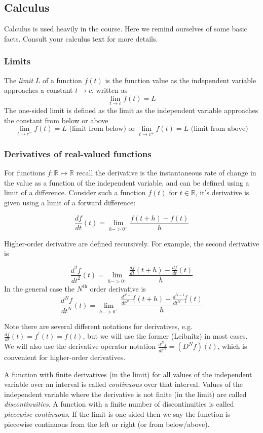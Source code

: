 \subsection{Calculus}

Calculus is used heavily in the course. Here we remind ourselves of some basic facts. Consult your calculus text for more details.

\subsubsection*{Limits}

The \textit{limit} $L$ of a function $f(t)$ is the function value as the independent variable approaches a constant $t\rightarrow c$, written as
\[
\lim_{t\rightarrow c} f(t) = L
\]
The one-sided limit is defined as the limit as the independent variable approaches the constant from below or above
\[
\lim_{t\rightarrow c^-} f(t) = L \mbox{ (limit from below) or } \lim_{t\rightarrow c^+} f(t) = L \mbox{ (limit from above)}
\]

\subsubsection*{Derivatives of real-valued functions}

For functions $f:\mathbb{R}\mapsto\mathbb{R}$ recall the derivative is the instantaneous rate of change in the value as a function of the independent variable, and can be defined using a limit of a difference. Consider such a function $f(t)$ for $t\in\mathbb{R}$, it's derivative is given using a limit of a forward difference:

\[
\frac{df}{dt} (t) = \lim_{h->0^+} \frac{f(t+h)-f(t)}{h}
\]

Higher-order derivative are defined recursively. For example, the second derivative is

\[
\frac{d^2f}{dt^2} (t) = \lim_{h->0^+} \frac{\frac{df}{dt}(t+h)-\frac{df}{dt}(t)}{h}
\]
In the general case the $N^\text{th}$ order derivative is
\[
\frac{d^Nf}{dt^N} (t) = \lim_{h->0^+} \frac{\frac{d^{N-1}f}{dt^{N-1}}(t+h)-\frac{d^{N-1}f}{dt^{N-1}}(t)}{h}
\]

Note there are several different notations for derivatives, e.g. $\frac{df}{dt}(t) = f^\prime (t) = \dot{f}(t)$, but we will use the former (Leibnitz) in most cases. We will also use the derivative operator notation $\frac{d^Nf}{dt^N} = (D^N f)(t)$, which is convenient for higher-order derivatives.

A function with finite derivatives (in the limit) for all values of the independent variable over an interval is called \textit{continuous} over that interval. Values of the independent variable where the derivative is not finite (in the limit) are called \textit{discontinuities}. A function with a finite number of discontinuities is called \textit{piecewise continuous}. If the limit is one-sided then we say the function is piecewise continuous from the left or right (or from below/above).

